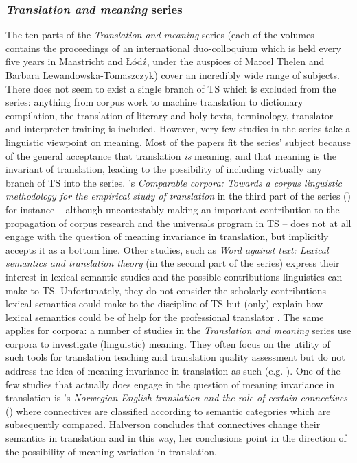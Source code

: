 \subsubsection{\textit{Translation and meaning} series}\label{sec:2.2.3.1}  
The ten parts of the \textit{Translation and meaning} series (each of the volumes contains the proceedings of an international duo-colloquium which is held every five years in Maastricht and Łódź, under the auspices of Marcel Thelen and Barbara Lewandowska-Tomaszczyk) cover an incredibly wide range of subjects. There does not seem to exist a single branch of TS which is excluded from the series: anything from corpus work to machine translation to dictionary compilation, the translation of literary and holy texts, terminology, translator and interpreter training is included. However, very few studies in the series take a linguistic viewpoint on meaning. Most of the papers fit the series’ subject because of the general acceptance that translation \textit{is} meaning, and that meaning is the invariant of translation, leading to the possibility of including virtually any branch of TS into the series. \citeauthor{thelen_comparable_1996}’s \textit{Comparable corpora: Towards a corpus linguistic methodology for the empirical study of translation} in the third part of the series (\citeyear{thelen_comparable_1996}) for instance – although uncontestably making an important contribution to the propagation of corpus research and the universals program in TS – does not at all engage with the question of meaning invariance in translation, but implicitly accepts it as a bottom line. Other studies, such as   \textit{Word against text: Lexical semantics and translation theory} (in the second part of the series) express their interest in lexical semantic studies and the possible contributions linguistics can make to TS. Unfortunately, they do not consider the scholarly contributions lexical semantics could make to the discipline of TS but (only) explain how lexical semantics could be of help for the professional translator \citep[100]{lewandowska-tomasczyk_specification_2010}. The same applies for corpora: a number of studies in the \textit{Translation and meaning} series use corpora to investigate (linguistic) meaning. They often focus on the utility of such tools for translation teaching and translation quality assessment but do not address the idea of meaning invariance in translation as such (e.g. \citealt{thelen_equivalence_1997,thelen_corpus-based_2007,thelen_semantic_2008}). One of the few studies that actually does engage in the question of meaning invariance in translation is \citeauthor{thelen_norwegian-english_1996}'s \textit{Norwegian-English translation and the role of certain connectives} (\citeyear{thelen_norwegian-english_1996}) where connectives are classified according to semantic categories which are subsequently compared. Halverson concludes that connectives change their semantics in translation and in this way, her conclusions point in the direction of the possibility of meaning variation in translation.

